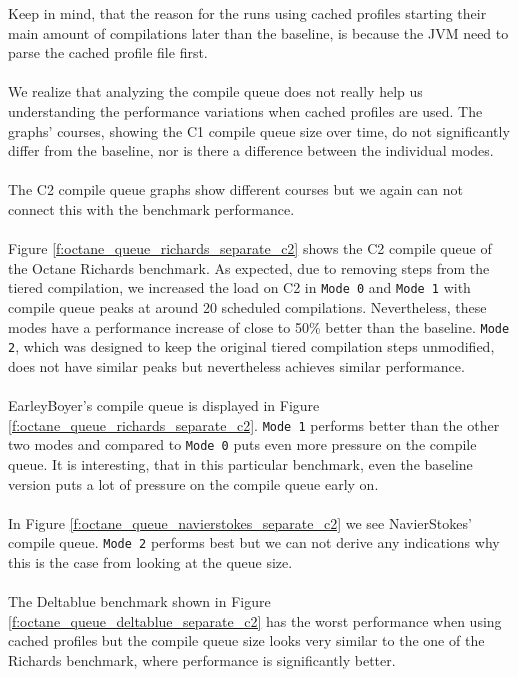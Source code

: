Keep in mind, that the reason for the runs using cached profiles starting their main amount of compilations later than the baseline, is because the JVM need to parse the cached profile file first.
\\\\
We realize that analyzing the compile queue does not really help us understanding the performance variations when cached profiles are used.
The graphs' courses, showing the C1 compile queue size over time, do not significantly differ from the baseline, nor is there a difference between the individual modes.
\\\\
The C2 compile queue graphs show different courses but we again can not connect this with the benchmark performance.
\\\\
Figure \ref{f:octane_queue_richards_separate_c2} shows the C2 compile queue of the Octane Richards benchmark. As expected, due to removing steps from the tiered compilation, we increased the load on C2 in \texttt{Mode 0} and \texttt{Mode 1} with compile queue peaks at around 20 scheduled compilations. Nevertheless, these modes have a performance increase of close to 50\% better than the baseline. \texttt{Mode 2}, which was designed to keep the original tiered compilation steps unmodified, does not have similar peaks but nevertheless achieves similar performance.
\\\\
EarleyBoyer's compile queue is displayed in Figure \ref{f:octane_queue_richards_separate_c2}. \texttt{Mode 1} performs better than the other two modes and compared to \texttt{Mode 0} puts even more pressure on the compile queue.
It is interesting, that in this particular benchmark, even the baseline version puts a lot of pressure on the compile queue early on.
\\\\
In Figure \ref{f:octane_queue_navierstokes_separate_c2} we see NavierStokes' compile queue. \texttt{Mode 2} performs best but we can not derive any indications why this is the case from looking at the queue size.
\\\\
The Deltablue benchmark shown in Figure \ref{f:octane_queue_deltablue_separate_c2} has the worst performance when using cached profiles but the compile queue size looks very similar to the one of the Richards benchmark, where performance is significantly better.
\\\\
